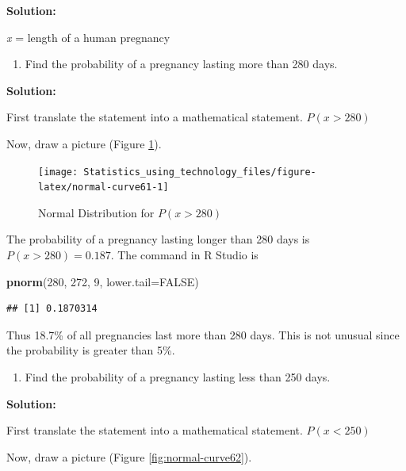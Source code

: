 \documentclass[
]{book}
\newenvironment{Shaded}{\begin{snugshade}}{\end{snugshade}}
\newcommand{\DataTypeTok}[1]{\textcolor[rgb]{0.13,0.29,0.53}{#1}}
\newcommand{\DecValTok}[1]{\textcolor[rgb]{0.00,0.00,0.81}{#1}}
\newcommand{\KeywordTok}[1]{\textcolor[rgb]{0.13,0.29,0.53}{\textbf{#1}}}
\newcommand{\NormalTok}[1]{#1}
\newcommand{\OtherTok}[1]{\textcolor[rgb]{0.56,0.35,0.01}{#1}}
\providecommand{\tightlist}{%
  \setlength{\itemsep}{0pt}\setlength{\parskip}{0pt}}
\begin{document}
\textbf{Solution:}

\emph{x} = length of a human pregnancy

\begin{enumerate}
\def\labelenumi{\alph{enumi}.}
\setcounter{enumi}{1}
\tightlist
\item
  Find the probability of a pregnancy lasting more than 280 days.
\end{enumerate}

\textbf{Solution:}

First translate the statement into a mathematical statement. \(P(x>280)\)

Now, draw a picture (Figure \ref{fig:normal-curve61}).



\begin{figure}
\texttt{[image: Statistics\_using\_technology\_files/figure-latex/normal-curve61-1]} \caption{Normal Distribution for \(P(x>280)\)}\label{fig:normal-curve61}
\end{figure}

The probability of a pregnancy lasting longer than 280 days is \(P(x>280)=0.187\). The command in R Studio is

\begin{Shaded}
\begin{Highlighting}[]
\KeywordTok{pnorm}\NormalTok{(}\DecValTok{280}\NormalTok{, }\DecValTok{272}\NormalTok{, }\DecValTok{9}\NormalTok{, }\DataTypeTok{lower.tail=}\OtherTok{FALSE}\NormalTok{)}
\end{Highlighting}
\end{Shaded}

\begin{verbatim}
## [1] 0.1870314
\end{verbatim}

Thus 18.7\% of all pregnancies last more than 280 days. This is not unusual since the probability is greater than 5\%.

\begin{enumerate}
\def\labelenumi{\alph{enumi}.}
\setcounter{enumi}{2}
\tightlist
\item
  Find the probability of a pregnancy lasting less than 250 days.
\end{enumerate}

\textbf{Solution:}

First translate the statement into a mathematical statement. \(P(x<250)\)

Now, draw a picture (Figure \ref{fig:normal-curve62}).
\end{document}
